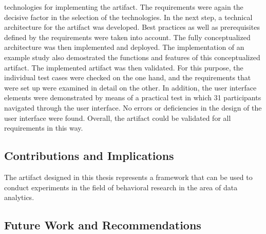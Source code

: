technologies for implementing the artifact. The requirements were again the decisive factor in the selection of the technologies. In the next step, a technical architecture for the artifact was developed. Best practices as well as prerequisites defined by the requirements were taken into account. The fully conceptualized architecture was then implemented and deployed. The implementation of an example study also demostrated the functions and features of this conceptualized artifact. The implemented artifact was then validated. For this purpose, the individual test cases were checked on the one hand, and the requirements that were set up were examined in detail on the other. In addition, the user interface elements were demonstrated by means of a practical test in which 31 participants navigated through the user interface. No errors or deficiencies in the design of the user interface were found. Overall, the artifact could be validated for all requirements in this way.

\subsection{Contributions and Implications}

The artifact designed in this thesis represents a framework that can be used to conduct experiments in the field of behavioral research in the area of data analytics.

\subsection{Future Work and Recommendations}